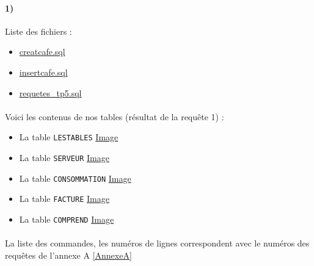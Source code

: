 \documentclass{report}
\begin{document}
\paragraph{1)}Liste des fichiers :

\begin{itemize}
	\item \href{./TP5/creatcafe.sql}{creatcafe.sql}
	\item \href{./TP5/insertcafe.sql}{insertcafe.sql}
	\item \href{./TP5/requetes_tp5.sql}{requetes\_tp5.sql}
\end{itemize}

\paragraph{}Voici les contenus de nos tables (résultat de la requête 1) :
\begin{itemize}
	\item La table {\tt LESTABLES} \href{run:./Images/TP5/lestables.png}{Image}
	\item La table {\tt SERVEUR} \href{run:./Images/TP5/serveur.png}{Image}
	\item La table {\tt CONSOMMATION} \href{run:./Images/TP5/consommation.png}{Image}
	\item La table {\tt FACTURE} \href{run:./Images/TP5/facture.png}{Image}
	\item La table {\tt COMPREND} \href{run:./Images/TP5/comprend.png}{Image}
\end{itemize}

\paragraph{}La liste des commandes, les numéros de lignes correspondent avec le numéros des requêtes de l'annexe A \autoref{AnnexeA}
\end{document}
